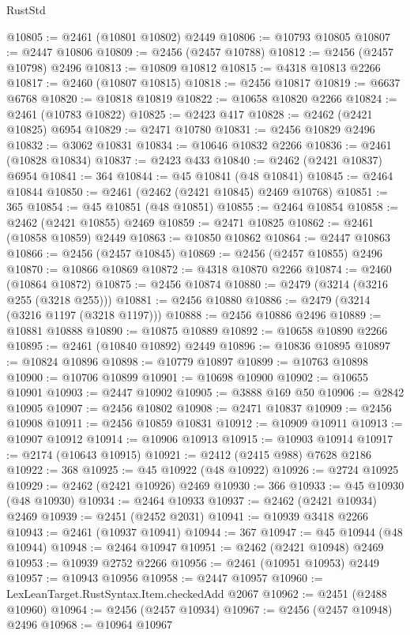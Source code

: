 \begin{lexlean}{RustStd}
\begin{coremodule}
@10805 := @2461 (@10801 @10802) @2449
@10806 := @10793 @10805
@10807 := @2447 @10806
@10809 := @2456 (@2457 @10788)
@10812 := @2456 (@2457 @10798) @2496
@10813 := @10809 @10812
@10815 := @4318 @10813 @2266
@10817 := @2460 (@10807 @10815)
@10818 := @2456 @10817
@10819 := @6637 @6768
@10820 := @10818 @10819
@10822 := @10658 @10820 @2266
@10824 := @2461 (@10783 @10822)
@10825 := @2423 @417
@10828 := @2462 (@2421 @10825) @6954
@10829 := @2471 @10780
@10831 := @2456 @10829 @2496
@10832 := @3062 @10831
@10834 := @10646 @10832 @2266
@10836 := @2461 (@10828 @10834)
@10837 := @2423 @433
@10840 := @2462 (@2421 @10837) @6954
@10841 := 364
@10844 := @45 @10841 (@48 @10841)
@10845 := @2464 @10844
@10850 := @2461 (@2462 (@2421 @10845) @2469 @10768)
@10851 := 365
@10854 := @45 @10851 (@48 @10851)
@10855 := @2464 @10854
@10858 := @2462 (@2421 @10855) @2469
@10859 := @2471 @10825
@10862 := @2461 (@10858 @10859) @2449
@10863 := @10850 @10862
@10864 := @2447 @10863
@10866 := @2456 (@2457 @10845)
@10869 := @2456 (@2457 @10855) @2496
@10870 := @10866 @10869
@10872 := @4318 @10870 @2266
@10874 := @2460 (@10864 @10872)
@10875 := @2456 @10874
@10880 := @2479 (@3214 (@3216 @255 (@3218 @255)))
@10881 := @2456 @10880
@10886 := @2479 (@3214 (@3216 @1197 (@3218 @1197)))
@10888 := @2456 @10886 @2496
@10889 := @10881 @10888
@10890 := @10875 @10889
@10892 := @10658 @10890 @2266
@10895 := @2461 (@10840 @10892) @2449
@10896 := @10836 @10895
@10897 := @10824 @10896
@10898 := @10779 @10897
@10899 := @10763 @10898
@10900 := @10706 @10899
@10901 := @10698 @10900
@10902 := @10655 @10901
@10903 := @2447 @10902
@10905 := @3888 @169 @50
@10906 := @2842 @10905
@10907 := @2456 @10802
@10908 := @2471 @10837
@10909 := @2456 @10908
@10911 := @2456 @10859 @10831
@10912 := @10909 @10911
@10913 := @10907 @10912
@10914 := @10906 @10913
@10915 := @10903 @10914
@10917 := @2174 (@10643 @10915)
@10921 := @2412 (@2415 @988) @7628 @2186
@10922 := 368
@10925 := @45 @10922 (@48 @10922)
@10926 := @2724 @10925
@10929 := @2462 (@2421 @10926) @2469
@10930 := 366
@10933 := @45 @10930 (@48 @10930)
@10934 := @2464 @10933
@10937 := @2462 (@2421 @10934) @2469
@10939 := @2451 (@2452 @2031)
@10941 := @10939 @3418 @2266
@10943 := @2461 (@10937 @10941)
@10944 := 367
@10947 := @45 @10944 (@48 @10944)
@10948 := @2464 @10947
@10951 := @2462 (@2421 @10948) @2469
@10953 := @10939 @2752 @2266
@10956 := @2461 (@10951 @10953) @2449
@10957 := @10943 @10956
@10958 := @2447 @10957
@10960 := LexLeanTarget.RustSyntax.Item.checkedAdd @2067
@10962 := @2451 (@2488 @10960)
@10964 := @2456 (@2457 @10934)
@10967 := @2456 (@2457 @10948) @2496
@10968 := @10964 @10967

\end{coremodule}
\end{lexlean}

